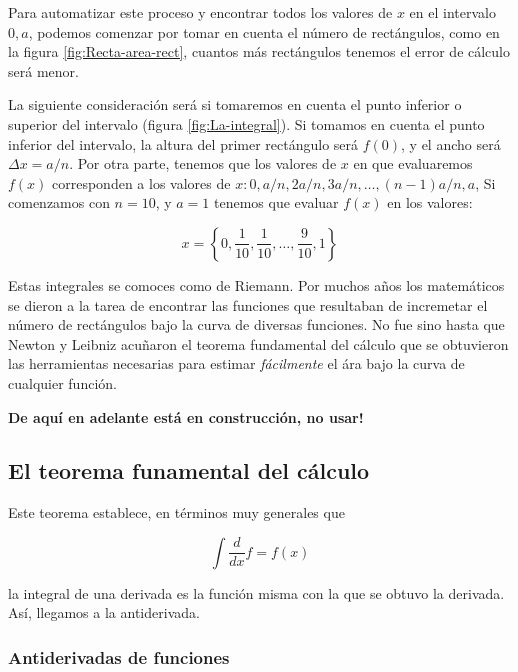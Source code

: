 \documentclass[
]{book}
\begin{document}
Para automatizar este proceso y encontrar todos los valores de \(x\) en el intervalo \(0, a\), podemos comenzar por tomar en cuenta el número de rectángulos, como en la figura \ref{fig:Recta-area-rect}, cuantos más rectángulos tenemos el error de cálculo será menor.

La siguiente consideración será si tomaremos en cuenta el punto inferior o superior del intervalo (figura \ref{fig:La-integral}). Si tomamos en cuenta el punto inferior del intervalo, la altura del primer rectángulo será \(f(0)\), y el ancho será \(\Delta x = a/n\). Por otra parte, tenemos que los valores de \(x\) en que evaluaremos \(f(x)\) corresponden a los valores de \(x: 0, a/n, 2a/n, 3a/n, \dots, (n-1)a/n, a\), Si comenzamos con \(n = 10\), y \(a = 1\) tenemos que evaluar \(f(x)\) en los valores:

\[x = \left \{ 0, \frac{1}{10}, \frac{1}{10}, \dots, \frac{9}{10}, 1 \right \}\]

Estas integrales se comoces como de Riemann. Por muchos años los matemáticos se dieron a la tarea de encontrar las funciones que resultaban de incremetar el número de rectángulos bajo la curva de diversas funciones. No fue sino hasta que Newton y Leibniz acuñaron el teorema fundamental del cálculo que se obtuvieron las herramientas necesarias para estimar \emph{fácilmente} el ára bajo la curva de cualquier función.

\textbf{De aquí en adelante está en construcción, no usar!}

\hypertarget{el-teorema-funamental-del-cuxe1lculo}{%
\subsection{El teorema funamental del cálculo}\label{el-teorema-funamental-del-cuxe1lculo}}

Este teorema establece, en términos muy generales que

\begin{equation}
\int \frac{d}{dx}f = f(x)
\end{equation}

la integral de una derivada es la función misma con la que se obtuvo la derivada. Así, llegamos a la antiderivada.

\hypertarget{antiderivadas-de-funciones}{%
\subsubsection{Antiderivadas de funciones}\label{antiderivadas-de-funciones}}
\end{document}

